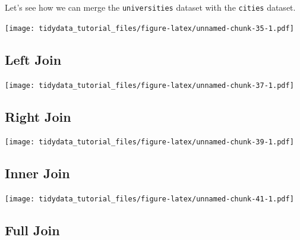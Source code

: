 \documentclass[]{article}
\newenvironment{Shaded}{\begin{snugshade}}{\end{snugshade}}
\newcommand{\KeywordTok}[1]{\textcolor[rgb]{0.13,0.29,0.53}{\textbf{{#1}}}}
\newcommand{\DataTypeTok}[1]{\textcolor[rgb]{0.13,0.29,0.53}{{#1}}}
\newcommand{\StringTok}[1]{\textcolor[rgb]{0.31,0.60,0.02}{{#1}}}
\newcommand{\NormalTok}[1]{{#1}}
\theoremstyle{definition}
\theoremstyle{definition}
\theoremstyle{definition}
\theoremstyle{remark}
\begin{document}
Let's see how we can merge the \texttt{universities} dataset with the
\texttt{cities} dataset.

\texttt{[image: tidydata\_tutorial\_files/figure-latex/unnamed-chunk-35-1.pdf]}

\subsection{Left Join}\label{left-join}

\begin{Shaded}
\end{Shaded}

\texttt{[image: tidydata\_tutorial\_files/figure-latex/unnamed-chunk-37-1.pdf]}

\subsection{Right Join}\label{right-join}

\begin{Shaded}
\end{Shaded}

\texttt{[image: tidydata\_tutorial\_files/figure-latex/unnamed-chunk-39-1.pdf]}

\subsection{Inner Join}\label{inner-join}

\begin{Shaded}
\end{Shaded}

\texttt{[image: tidydata\_tutorial\_files/figure-latex/unnamed-chunk-41-1.pdf]}

\subsection{Full Join}\label{full-join}
\end{document}
